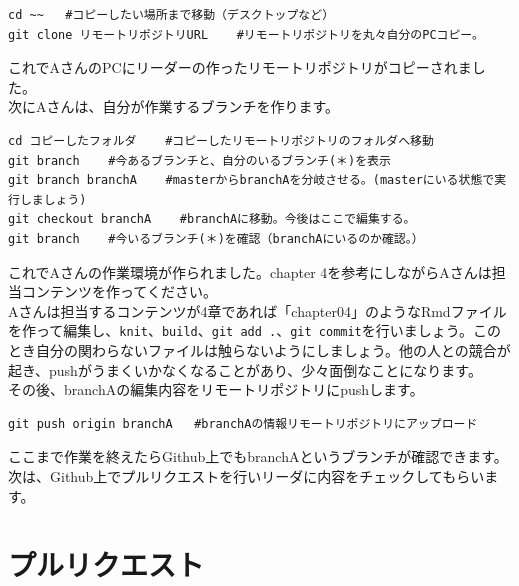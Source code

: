 \documentclass[
]{book}
\begin{document}
\begin{verbatim}
cd ~~   #コピーしたい場所まで移動（デスクトップなど）
git clone リモートリポジトリURL    #リモートリポジトリを丸々自分のPCコピー。
\end{verbatim}

これでAさんのPCにリーダーの作ったリモートリポジトリがコピーされました。\\
次にAさんは、自分が作業するブランチを作ります。

\begin{verbatim}
cd コピーしたフォルダ    #コピーしたリモートリポジトリのフォルダへ移動
git branch    #今あるブランチと、自分のいるブランチ(＊)を表示
git branch branchA    #masterからbranchAを分岐させる。(masterにいる状態で実行しましょう)
git checkout branchA    #branchAに移動。今後はここで編集する。
git branch    #今いるブランチ(＊)を確認（branchAにいるのか確認。）
\end{verbatim}

これでAさんの作業環境が作られました。chapter 4を参考にしながらAさんは担当コンテンツを作ってください。\\
Aさんは担当するコンテンツが4章であれば「chapter04」のようなRmdファイルを作って編集し、\texttt{knit}、\texttt{build}、\texttt{git\ add\ .}、\texttt{git\ commit}を行いましょう。このとき自分の関わらないファイルは触らないようにしましょう。他の人との競合が起き、pushがうまくいかなくなることがあり、少々面倒なことになります。\\

その後、branchAの編集内容をリモートリポジトリにpushします。

\begin{verbatim}
git push origin branchA   #branchAの情報リモートリポジトリにアップロード
\end{verbatim}

ここまで作業を終えたらGithub上でもbranchAというブランチが確認できます。\\
次は、Github上でプルリクエストを行いリーダに内容をチェックしてもらいます。

\hypertarget{ux30d7ux30ebux30eaux30afux30a8ux30b9ux30c8}{%
\section{プルリクエスト}\label{ux30d7ux30ebux30eaux30afux30a8ux30b9ux30c8}}
\end{document}
